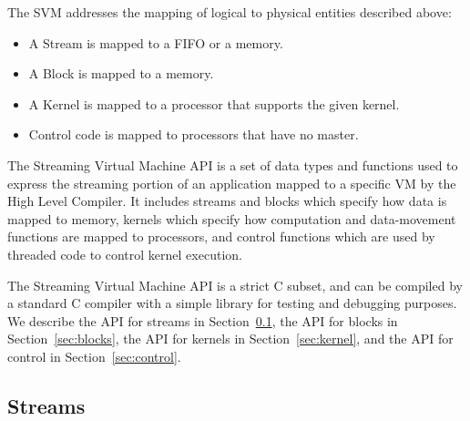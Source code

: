 
The SVM addresses the mapping of logical to physical entities
described above:

\begin{itemize}

\item A Stream is mapped to a FIFO or a memory.

\item A Block is mapped to a memory.

\item A Kernel is mapped to a processor that supports the given kernel.

\item Control code is mapped to processors that have no master.

\end{itemize}


The Streaming Virtual Machine API is a set of data types and functions
used to express the streaming portion of an application mapped to a
specific VM by the High Level Compiler. It includes streams and blocks
which specify how data is mapped to memory, kernels which specify how
computation and data-movement functions are mapped to processors, and
control functions which are used by threaded code to control kernel
execution.

The Streaming Virtual Machine API is a strict C subset, and can be
compiled by a standard C compiler with a simple library for testing
and debugging purposes.  We describe the API for streams in
Section~\ref{sec:streams}, the API for blocks in
Section~\ref{sec:blocks}, the API for kernels in
Section~\ref{sec:kernel}, and the API for control in
Section~\ref{sec:control}.

\subsection{Streams}
\label{sec:streams}

